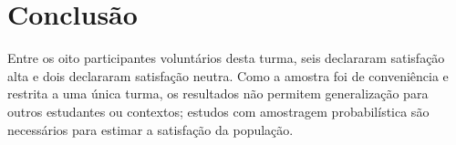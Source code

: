 \section{Conclusão}
Entre os oito participantes voluntários desta turma, seis declararam satisfação alta e dois declararam satisfação neutra.
Como a amostra foi de conveniência e restrita a uma única turma, os resultados não permitem generalização para outros estudantes ou contextos; estudos com amostragem probabilística são necessários para estimar a satisfação da população.
